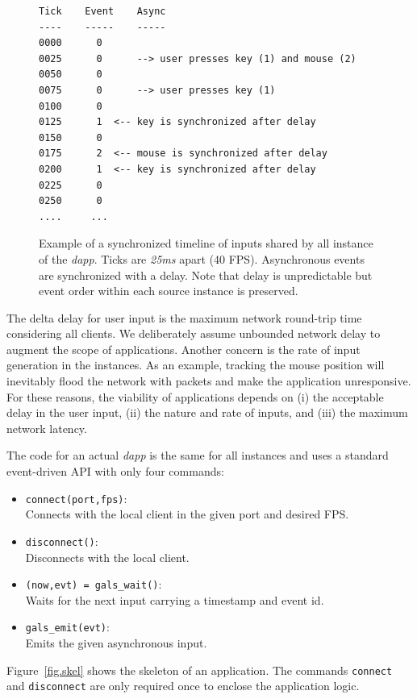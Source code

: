 \documentclass[sigplan,screen]{acmart}
\begin{document}
\begin{figure}[t]
{\scriptsize
\begin{verbatim}
Tick    Event    Async
----    -----    -----
0000      0
0025      0      --> user presses key (1) and mouse (2)
0050      0
0075      0      --> user presses key (1)
0100      0
0125      1  <-- key is synchronized after delay
0150      0
0175      2  <-- mouse is synchronized after delay
0200      1  <-- key is synchronized after delay
0225      0
0250      0
....     ...
\end{verbatim}
}
  \caption{
    \label{fig.timeline}
    Example of a synchronized timeline of inputs shared by all instance of the
    \emph{dapp}.
    Ticks are \emph{25ms} apart (40 FPS).
    Asynchronous events are synchronized with a delay.
    Note that delay is unpredictable but event order within each source
    instance is preserved.
  }
\end{figure}

The delta delay for user input is the maximum network round-trip time
considering all clients.
We deliberately assume unbounded network delay to augment the scope of
applications.
Another concern is the rate of input generation in the instances.
As an example, tracking the mouse position will inevitably flood the network
with packets and make the application unresponsive.
For these reasons, the viability of applications depends on
    (i) the acceptable delay in the user input,
    (ii) the nature and rate of inputs, and
    (iii) the maximum network latency.

The code for an actual \emph{dapp} is the same for all instances and uses a
standard event-driven API with only four commands:
\begin{itemize}
\item \texttt{connect(port,fps)}:        \\Connects with the local client in the given port and desired FPS.
\item \texttt{disconnect()}:             \\Disconnects with the local client.
\item \texttt{(now,evt) = gals\_wait()}: \\Waits for the next input carrying a timestamp and event id.
\item \texttt{gals\_emit(evt)}:          \\Emits the given asynchronous input.
\end{itemize}
Figure~\ref{fig.skel} shows the skeleton of an application.
The commands \texttt{connect} and \texttt{disconnect} are only required once to
enclose the application logic.
\end{document}
